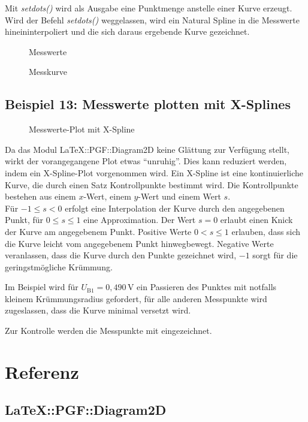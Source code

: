 \documentclass[ngerman,origlongtable]{scrartcl}
\newcommand{\includepgfimage}[2]{%
\begin{figure}%
{\centering%
\caption{#2}\label{fig:#1}%
}%
\end{figure}%
}
\begin{document}
Mit
\textit{set\textunderscore{}dots()\/} wird als Ausgabe eine Punktmenge
anstelle einer Kurve erzeugt.\\
Wird der Befehl
\textit{set\textunderscore{}dots()\/} weggelassen, wird ein Natural Spline
in die Messwerte hineininterpoliert und die sich daraus ergebende Kurve
gezeichnet.
\clearpage
\includepgfimage{../examples/test013a}{Messwerte}
\clearpage

\clearpage
\includepgfimage{../examples/test014a}{Messkurve}
\clearpage

\clearpage
\subsection[X-Splines]{Beispiel 13: Messwerte plotten mit X-Splines}
\includepgfimage{../examples/test015a}{Messwerte-Plot mit X-Spline}
Da das Modul LaTeX::PGF::Diagram2D keine Glättung zur Verfügung stellt, wirkt
der vorangegangene Plot etwas "`unruhig"'.
Dies kann reduziert werden, indem ein X-Spline-Plot vorgenommen wird.
Ein X-Spline ist eine kontinuierliche Kurve, die durch einen Satz
Kontrollpunkte bestimmt wird. Die Kontrollpunkte bestehen aus einem
\(x\)-Wert, einem \(y\)-Wert und einem Wert \(s\).\\
Für \(-1\leq{}s<0\) erfolgt eine Interpolation der Kurve durch den
angegebenen Punkt, für \(0\leq{}s\leq{}1\) eine Approximation.
Der Wert \(s=0\) erlaubt einen Knick der Kurve am angegebenem Punkt.
Positive Werte \(0<s\leq{}1\) erlauben, dass sich die Kurve leicht vom
angegebenem Punkt hinwegbewegt. Negative Werte veranlassen, dass die Kurve
durch den Punkte gezeichnet wird, \(-1\) sorgt für die geringstmögliche
Krümmung.

Im Beispiel wird für \(U_{\text{B1}}=0,490\,\text{V}\) ein Passieren des
Punktes mit notfalls kleinem Krümmungsradius gefordert, für alle anderen
Messpunkte wird zugeslassen, dass die Kurve minimal versetzt wird.

Zur Kontrolle werden die Messpunkte mit eingezeichnet.
\clearpage

\clearpage
\section{Referenz}
\subsection[Diagram]{LaTeX::PGF::Diagram2D}
\end{document}
